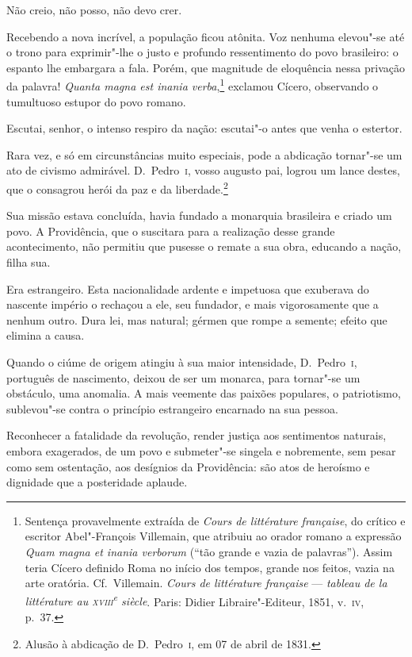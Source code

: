 Não creio, não posso, não devo crer. 

Recebendo a nova incrível, a população ficou atônita. Voz nenhuma
elevou"-se até o trono para exprimir"-lhe o justo e profundo
ressentimento do povo brasileiro: o espanto lhe embargara a fala.
Porém, que magnitude de eloquência nessa privação da palavra!
\textit{Quanta magna est inania
verba},\footnote{ Sentença provavelmente extraída de
 \textit{Cours de littérature française}, do crítico e escritor Abel"-François Villemain, 
que atribuiu ao orador romano a expressão \textit{Quam magna et inania verborum} 
(``tão grande e vazia de palavras''). Assim teria Cícero definido Roma no início dos tempos, 
grande nos feitos, vazia na arte oratória. Cf.~Villemain. \textit{Cours de littérature
française} --- \textit{tableau de la littérature au \textsc{xviii}\textsuperscript{e} siècle}.
Paris: Didier Libraire"-Editeur, 1851, v.~\textsc{iv}, p.~37.} 
exclamou Cícero, observando o tumultuoso estupor do povo romano. 

 Escutai, senhor, o intenso respiro da nação: escutai"-o antes que venha o estertor. 

 Rara vez, e só em circunstâncias muito especiais, pode a abdicação
tornar"-se um ato de civismo admirável. D.~Pedro~\textsc{i}, vosso augusto pai,
logrou um lance destes, que o consagrou herói da paz e da
liberdade.\footnote{ Alusão à abdicação de D.~Pedro~\textsc{i}, em 07 de abril de 1831.}
 

 Sua missão estava concluída, havia fundado a monarquia brasileira e
criado um povo. A Providência, que o suscitara para a realização desse
grande acontecimento, não permitiu que pusesse o remate a sua obra,
educando a nação, filha sua. 

 Era estrangeiro. Esta nacionalidade ardente e impetuosa que exuberava
do nascente império o rechaçou a ele, seu fundador, e mais
vigorosamente que a nenhum outro. Dura lei, mas natural; gérmen que
rompe a semente; efeito que elimina a causa. 

 Quando o ciúme de origem atingiu à sua maior intensidade, D.~Pedro~\textsc{i},
português de nascimento, deixou de ser um monarca, para tornar"-se um
obstáculo, uma anomalia. A mais veemente das paixões populares, o
patriotismo, sublevou"-se contra o princípio estrangeiro encarnado na sua pessoa.  

 Reconhecer a fatalidade da revolução, render justiça aos sentimentos
naturais, embora exagerados, de um povo e submeter"-se singela e
nobremente, sem pesar como sem ostentação, aos desígnios da
Providência: são atos de heroísmo e dignidade que a posteridade aplaude. 

